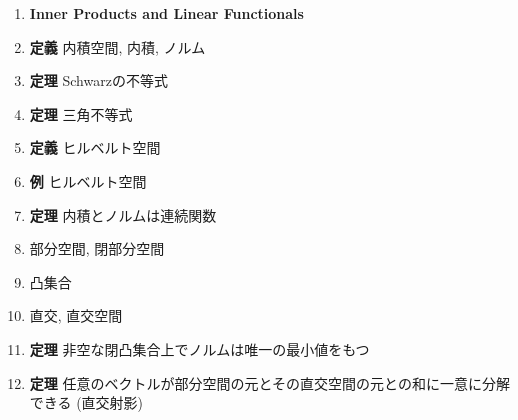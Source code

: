 \documentclass[a4paper,18pt]{jsarticle}
\begin{document}
\begin{enumerate}
  \item[] \hspace{-8mm}\textbf{Inner Products and Linear Functionals}
  \item \textbf{定義} 内積空間, 内積, ノルム
  \item \textbf{定理} Schwarzの不等式
  \item \textbf{定理} 三角不等式
  \item \textbf{定義} ヒルベルト空間
  \item \textbf{例} ヒルベルト空間
  \item \textbf{定理} 内積とノルムは連続関数
  \item 部分空間, 閉部分空間
  \item 凸集合
  \item 直交, 直交空間
  \item \textbf{定理} 非空な閉凸集合上でノルムは唯一の最小値をもつ
  \item \textbf{定理} 任意のベクトルが部分空間の元とその直交空間の元との和に一意に分解できる (直交射影)
\end{enumerate}
\end{document}
